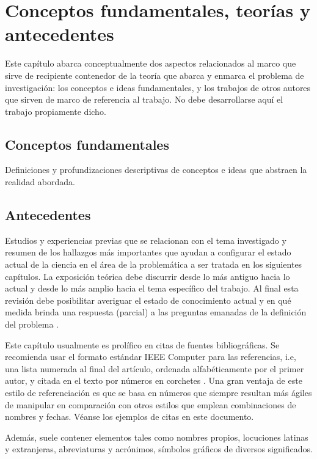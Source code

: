 \fancyhead{}
\fancyfoot{}
\newtheorem{teorema}{Teorema}
\cfoot{\thepage}


\chapter{Conceptos fundamentales, teorías y antecedentes}
Este capítulo abarca conceptualmente dos aspectos relacionados al marco que sirve de recipiente contenedor de la teoría que abarca y enmarca el problema de investigación: los conceptos e ideas fundamentales, y los trabajos de otros autores que sirven de marco de referencia al trabajo. No debe desarrollarse aquí el trabajo propiamente dicho.

\section{Conceptos fundamentales}
Definiciones y profundizaciones descriptivas de conceptos e ideas que abstraen la realidad abordada.

\section{Antecedentes}
Estudios y experiencias previas que se relacionan con el tema investigado y resumen de los hallazgos más importantes que ayudan a configurar el estado actual de la ciencia en el área de la problemática a ser tratada en los siguientes capítulos. La exposición teórica debe discurrir desde lo más antiguo hacia lo actual y desde lo más amplio hacia el tema específico del trabajo. Al final esta revisión debe posibilitar averiguar el estado de conocimiento actual y en qué medida brinda una respuesta (parcial) a las preguntas emanadas de la definición del problema \cite{sampieri}.

Este capítulo usualmente es prolífico en citas de fuentes bibliográficas. Se recomienda usar el formato estándar IEEE Computer para las referencias, i.e, una lista numerada al final del artículo, ordenada alfabéticamente por el primer autor, y citada en el texto por números en corchetes \cite{ieee}. Una gran ventaja de este estilo de referenciación es que se basa en números que siempre resultan más ágiles de manipular en comparación con otros estilos que emplean combinaciones de nombres y fechas. Véanse los ejemplos de citas en este documento.

 Además, suele contener elementos tales como nombres propios, locuciones latinas y extranjeras, abreviaturas y acrónimos, símbolos gráficos de diversos significados.

